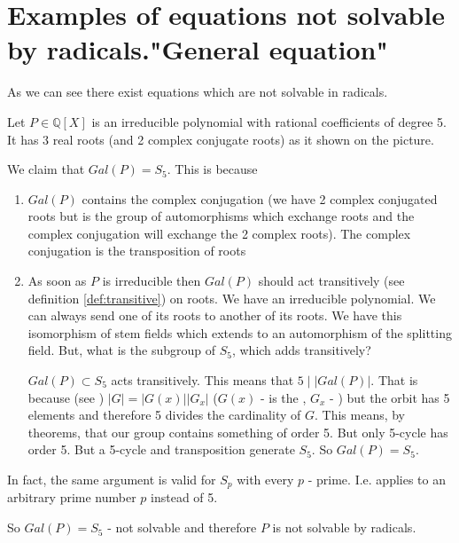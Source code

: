\section{Examples of equations not solvable by radicals."General
  equation"}
As we can see there exist equations which are not solvable in
radicals.

\begin{example}
  Let $P \in \mathbb{Q}\left[X\right]$ is an irreducible polynomial
  with rational 
  coefficients of degree 5. It has 3 real roots (and 2 complex
  conjugate roots) as it shown on the picture.
  

  We claim that $Gal\left(P\right) = S_5$. This is because
  \begin{enumerate}
    \item $Gal\left(P\right)$ contains the complex conjugation (we
      have 2 complex conjugated roots but  is
      the group of automorphisms which exchange roots and the complex
      conjugation will exchange the 2 complex roots).
      The complex conjugation is the transposition of roots
    \item As soon as $P$ is irreducible then $Gal\left(P\right)$
      should act transitively (see definition \ref{def:transitive}) on
      roots. We have an irreducible polynomial. We can always send
      one of its roots to another of its roots. We have this
      isomorphism of stem fields which extends to an automorphism of
      the splitting field. But, what is the subgroup of $S_5$, which adds
      transitively?

      $Gal\left(P\right) \subset S_5$ acts transitively. This means
      that $5 \mid \left|Gal\left(P\right)\right|$. That is because
      (see )
      $\left|G\right| = \left|G\left(x\right)\right| \left|G_x\right|$
      ($G\left(x\right)$ - is the ,
      $G_x$ - )
      but the orbit has 5 elements and therefore 5 divides
      the cardinality of $G$. This means, by  
      theorems, that our group contains something of order 5. But only
      5-cycle has order 5. But a 5-cycle and transposition generate
      $S_5$. So $Gal\left(P\right) = S_5$.      
  \end{enumerate}
  In fact, the same argument is valid for $S_p$ with every $p$ - prime. 
  I.e. applies to an arbitrary prime number $p$ instead of 5.

  So $Gal\left(P\right) = S_5$ - not solvable and therefore $P$ is not
  solvable by radicals.
  \label{ex:lec8_notsolvable1}
\end{example}

